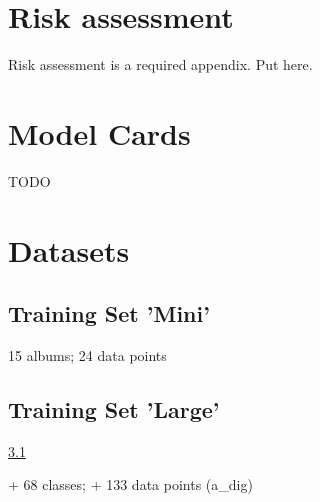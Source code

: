 \begin{uomappendix}
            
            
        
        \section{Risk assessment}
            \begin{temp}
                Risk assessment is a required appendix. Put here.
            \end{temp}
    
        \section{Model Cards}
            \begin{temp}
                TODO
            \end{temp}
    
        \section{Datasets}
    
            \subsection{Training Set 'Mini'} \label{data:mini}
    
                15 albums; 24 data points
    
            \subsection{Training Set 'Large'} \label{data:large}
    
                \ref{data:mini}
                
                + 68 classes; + 133 data points (a_dig)
    

\end{uomappendix}
